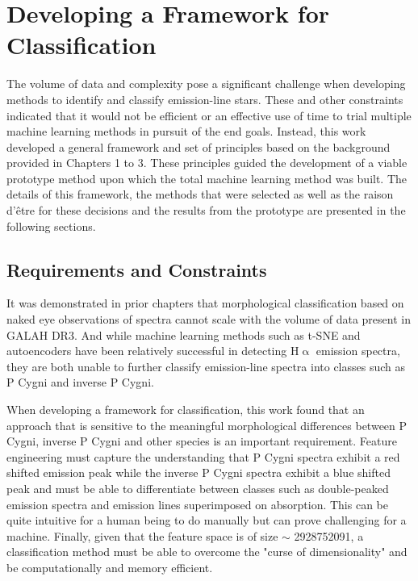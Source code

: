 \chapter{Developing a Framework for Classification}

The volume of data and complexity pose a significant challenge when developing methods to identify and classify emission-line stars. These and other constraints indicated that it would not be efficient or an effective use of time to trial multiple machine learning methods in pursuit of the end goals. Instead, this work developed a general framework and set of principles based on the background provided in Chapters 1 to 3. These principles guided the development of a viable prototype method upon which the total machine learning method was built. The details of this framework, the methods that were selected as well as the raison d'être for these decisions and the results from the prototype are presented in the following sections.

\section{Requirements and Constraints}

It was demonstrated in prior chapters that morphological classification based on naked eye observations of spectra cannot scale with the volume of data present in GALAH DR3. And while machine learning methods such as t-SNE and autoencoders\cite{traven2017galah}\cite{vcotar2021galah} have been relatively successful in detecting H$\upalpha$ emission spectra, they are both unable to further classify emission-line spectra into classes such as P Cygni and inverse P Cygni.

When developing a framework for classification, this work found that an approach that is sensitive to the meaningful morphological differences between P Cygni, inverse P Cygni and other species is an important requirement. Feature engineering must capture the understanding that P Cygni spectra exhibit a red shifted emission peak while the inverse P Cygni spectra exhibit a blue shifted peak and must be able to differentiate between classes such as double-peaked emission spectra and emission lines superimposed on absorption. This can be quite intuitive for a human being to do manually but can prove challenging for a machine. Finally, given that the feature space is of size $\sim$ \num[round-precision=2,round-mode=figures, scientific-notation=true]{2928752091}, a classification method must be able to overcome the "curse of dimensionality" and be computationally and memory efficient.

